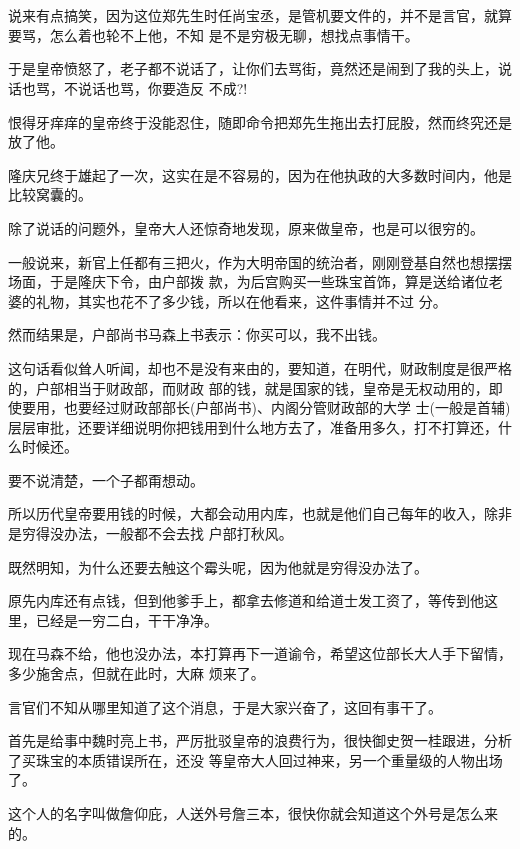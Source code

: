 \documentclass[11pt,a4paper,onecolumn]{article}
\begin{document}
\section[\thesection]{}

说来有点搞笑，因为这位郑先生时任尚宝丞，是管机要文件的，并不是言官，就算要骂，怎么着也轮不上他，不知
是不是穷极无聊，想找点事情干。

于是皇帝愤怒了，老子都不说话了，让你们去骂街，竟然还是闹到了我的头上，说话也骂，不说话也骂，你要造反
不成?!

恨得牙痒痒的皇帝终于没能忍住，随即命令把郑先生拖出去打屁股，然而终究还是放了他。

隆庆兄终于雄起了一次，这实在是不容易的，因为在他执政的大多数时间内，他是比较窝囊的。

除了说话的问题外，皇帝大人还惊奇地发现，原来做皇帝，也是可以很穷的。

一般说来，新官上任都有三把火，作为大明帝国的统治者，刚刚登基自然也想摆摆场面，于是隆庆下令，由户部拨
款，为后宫购买一些珠宝首饰，算是送给诸位老婆的礼物，其实也花不了多少钱，所以在他看来，这件事情并不过
分。

然而结果是，户部尚书马森上书表示：你买可以，我不出钱。

这句话看似耸人听闻，却也不是没有来由的，要知道，在明代，财政制度是很严格的，户部相当于财政部，而财政
部的钱，就是国家的钱，皇帝是无权动用的，即使要用，也要经过财政部部长(户部尚书)、内阁分管财政部的大学
士(一般是首辅)层层审批，还要详细说明你把钱用到什么地方去了，准备用多久，打不打算还，什么时候还。

要不说清楚，一个子都甭想动。

所以历代皇帝要用钱的时候，大都会动用内库，也就是他们自己每年的收入，除非是穷得没办法，一般都不会去找
户部打秋风。

既然明知，为什么还要去触这个霉头呢，因为他就是穷得没办法了。

原先内库还有点钱，但到他爹手上，都拿去修道和给道士发工资了，等传到他这里，已经是一穷二白，干干净净。

现在马森不给，他也没办法，本打算再下一道谕令，希望这位部长大人手下留情，多少施舍点，但就在此时，大麻
烦来了。

言官们不知从哪里知道了这个消息，于是大家兴奋了，这回有事干了。

首先是给事中魏时亮上书，严厉批驳皇帝的浪费行为，很快御史贺一桂跟进，分析了买珠宝的本质错误所在，还没
等皇帝大人回过神来，另一个重量级的人物出场了。

这个人的名字叫做詹仰庇，人送外号詹三本，很快你就会知道这个外号是怎么来的。
\end{document}
